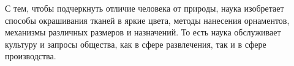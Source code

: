 
С тем, чтобы подчеркнуть отличие человека от природы, наука изобретает способы
окрашивания тканей в яркие цвета, методы нанесения орнаментов, механизмы различных размеров и назначений. То есть наука обслуживает культуру и запросы общества, как в сфере развлечения, так
и в сфере производства. 



